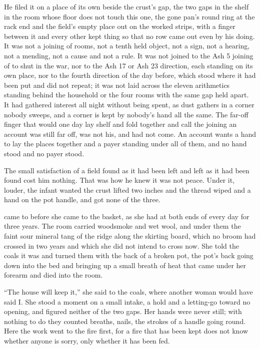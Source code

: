 He filed it on a place of its own beside the crust's gap, the two gaps in the shelf in the room whose floor does not touch this one, the gone pan's round ring at the rack end and the field's empty place out on the worked strips, with a finger between it and every other kept thing so that no row came out even by his doing. It was not a joining of rooms, not a tenth held object, not a sign, not a hearing, not a mending, not a cause and not a rule. It was not joined to the Ash 5 joining of  to  shut in the war, nor to the Ash 17 or Ash 23 direction, each standing on its own place, nor to the fourth direction of the day before, which stood where it had been put and did not repeat; it was not laid across the eleven arithmetics standing behind the household or the four rooms with the same gap held apart. It had gathered interest all night without being spent, as dust gathers in a corner nobody sweeps, and a corner is kept by nobody's hand all the same. The far-off finger that would one day lay shelf and fold together and call the joining an account was still far off, was not his, and had not come. An account wants a hand to lay the places together and a payer standing under all of them, and no hand stood and no payer stood.

The small satisfaction of a field found as it had been left and left as it had been found cost him nothing. That was how he knew it was not peace. Under it, louder, the infant wanted the crust lifted two inches and the thread wiped and a hand on the pot handle, and got none of the three.

\scenebreak

 came to  before she came to the basket, as she had at both ends of every day for three years. The room carried woodsmoke and wet wool, and under them the faint sour mineral tang of the  ridge along the skirting board, which no broom had crossed in two years and which she did not intend to cross now. She told the coals it was  and turned them with the back of a broken pot, the pot's back going down into the bed and bringing up a small breath of heat that came under her forearm and died into the room.

“The house will keep it,” she said to the coals, where another woman would have said I. She stood a moment on a small intake, a hold and a letting-go toward no opening, and figured neither of the two gaps. Her hands were never still; with nothing to do they counted breaths, nails, the strokes of a handle going round. Here the work went to the fire first, for a fire that has been kept does not know whether anyone is sorry, only whether it has been fed.

